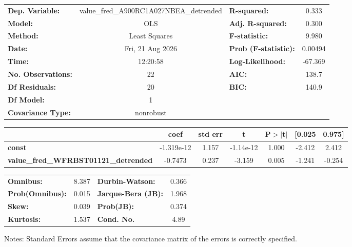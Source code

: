 \begin{center}
\begin{tabular}{lclc}
\toprule
\textbf{Dep. Variable:}                      & value\_fred\_A900RC1A027NBEA\_detrended & \textbf{  R-squared:         } &     0.333   \\
\textbf{Model:}                              &                   OLS                   & \textbf{  Adj. R-squared:    } &     0.300   \\
\textbf{Method:}                             &              Least Squares              & \textbf{  F-statistic:       } &     9.980   \\
\textbf{Date:}                               &             Fri, 21 Aug 2026            & \textbf{  Prob (F-statistic):} &  0.00494    \\
\textbf{Time:}                               &                 12:20:58                & \textbf{  Log-Likelihood:    } &   -67.369   \\
\textbf{No. Observations:}                   &                      22                 & \textbf{  AIC:               } &     138.7   \\
\textbf{Df Residuals:}                       &                      20                 & \textbf{  BIC:               } &     140.9   \\
\textbf{Df Model:}                           &                       1                 & \textbf{                     } &             \\
\textbf{Covariance Type:}                    &                nonrobust                & \textbf{                     } &             \\
\bottomrule
\end{tabular}
\begin{tabular}{lcccccc}
                                             & \textbf{coef} & \textbf{std err} & \textbf{t} & \textbf{P$> |$t$|$} & \textbf{[0.025} & \textbf{0.975]}  \\
\midrule
\textbf{const}                               &   -1.319e-12  &        1.157     & -1.14e-12  &         1.000        &       -2.412    &        2.412     \\
\textbf{value\_fred\_WFRBST01121\_detrended} &      -0.7473  &        0.237     &    -3.159  &         0.005        &       -1.241    &       -0.254     \\
\bottomrule
\end{tabular}
\begin{tabular}{lclc}
\textbf{Omnibus:}       &  8.387 & \textbf{  Durbin-Watson:     } &    0.366  \\
\textbf{Prob(Omnibus):} &  0.015 & \textbf{  Jarque-Bera (JB):  } &    1.968  \\
\textbf{Skew:}          &  0.039 & \textbf{  Prob(JB):          } &    0.374  \\
\textbf{Kurtosis:}      &  1.537 & \textbf{  Cond. No.          } &     4.89  \\
\bottomrule
\end{tabular}
\end{center}

Notes: \newline
 [1] Standard Errors assume that the covariance matrix of the errors is correctly specified.